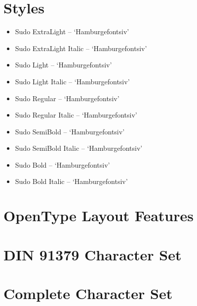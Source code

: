 \documentclass[paper=a4, 10pt]{scrbook}
\begin{document}
\section{Styles}
{\large
\begin{itemize}
	\item { Sudo ExtraLight – ‘Hamburgefontsiv’}
	\item { Sudo ExtraLight Italic – ‘Hamburgefontsiv’}
	\item { Sudo Light – ‘Hamburgefontsiv’}
	\item { Sudo Light Italic – ‘Hamburgefontsiv’}
	\item { Sudo Regular – ‘Hamburgefontsiv’}
	\item { Sudo Regular Italic – ‘Hamburgefontsiv’}
	\item { Sudo SemiBold – ‘Hamburgefontsiv’}
	\item { Sudo SemiBold Italic – ‘Hamburgefontsiv’}
	\item { Sudo Bold – ‘Hamburgefontsiv’}
	\item { Sudo Bold Italic – ‘Hamburgefontsiv’}
\end{itemize}}

\section{OpenType Layout Features}



\section{DIN 91379 Character Set}


\section{Complete Character Set}


\end{document}
